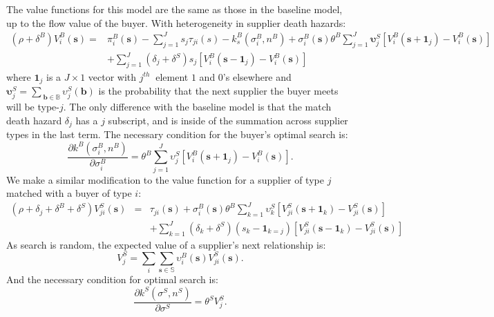 \documentclass[12pt]{article} \usepackage{amsmath,amssymb,amsthm,geometry,graphicx,setspace,algorithm,algpseudocode,float}
\begin{document}
The value functions for this model are the same as those in the baseline model, up to the flow value of the buyer.  With heterogeneity in supplier death hazards:
\begin{align}
\nonumber
(\rho + \delta^B) V_{i}^{B}(\mathbf{s}) = &\pi _{i}^{B}(\mathbf{s})- \sum_{j=1}^J s_j \tau_{ji}(s) - k_{s}^{B}(\sigma
_{i}^{B},n^B)+\sigma _{i}^{B}(\mathbf{s})\theta ^{B}\sum_{j=1}^{J}%
\mathbf{\upsilon }_{j}^{S}\left[ V_{i}^{B}(\mathbf{s}+\mathbf{1}_{j})-V_{i}^{B}(%
\mathbf{s})\right] \\
&+\sum_{j=1}^{J}\left(\delta_j + \delta^S\right) s_{j}\left[ V_{i}^{B}(\mathbf{s}-\mathbf{1}_{j})-V_{i}^{B}(\mathbf{s})\right]
\end{align}%
where $\mathbf{1}_{j}$
is a $J \times 1$ vector with $j^{th}\mathbf{\ }$%
element $1$ and $0$'s elsewhere and $\mathbf{\upsilon }_{j}^{S}=\sum_{\ \mathbf{b}\in \mathbb{B}}\upsilon
_{j}^{S}(\mathbf{b})$ is the probability that the next supplier the buyer
meets will be type-$j.$  The only difference with the baseline model is that the match death hazard $\delta_j$ has a $j$ subscript, and is inside of the summation across supplier types in the last term.  The necessary condition for the buyer's optimal search is:
\begin{equation}
\frac{\partial k^{B}\left( \sigma _{i}^{B},n^B \right) }{\partial
\sigma _{i}^{B}}=\theta ^{B}\sum_{j=1}^{J}\upsilon^S_j\left[ V_{i}^{B}(\mathbf{s}%
+\mathbf{1}_{j})-V_{i}^{B}(\mathbf{s})\right] .  \label{foc_buy}
\end{equation}
We make a similar modification to the value function for a supplier of type $j$ matched with a buyer of type $i$:
\begin{eqnarray}
(\rho + \delta_j + \delta^B + \delta^S) V_{ji}^{S}(\mathbf{s}) &=&\tau _{ji}(\mathbf{s})+\sigma _{i}^{B}(%
\mathbf{s})\theta ^{B}\sum_{k=1}^{J}\upsilon _{k}^{S}\left[ V_{ji}^{S}(%
\mathbf{s}+\mathbf{1}_{k})-V_{ji}^{S}(\mathbf{s})\right] \\
&&+ \sum_{k=1}^{J}\left(\delta_k + \delta^S\right)\left( s_{k}-\mathbf{1}_{k=j}\right) \left[
V_{ji}^{S}(\mathbf{s}-\mathbf{1}_{k})-V_{ji}^{S}(\mathbf{s})\right]
\end{eqnarray}%
As search is random, the expected value of a supplier's next relationship is:
\begin{equation}
V_{j}^{S}=\sum_{i}\sum_{\mathbf{s}\in \mathbb{S}}\upsilon _{i}^{B}(\mathbf{s}%
)V_{ji}^{S}(\mathbf{s}).
\end{equation}
And the necessary condition for optimal search is:
\begin{equation}
\frac{\partial k^{S}\left( \sigma ^{S},n^S\right) }{\partial \sigma
^{S}}=\theta ^{S}V_{j}^{S}.  \label{foc_sell}
\end{equation}
\end{document}
